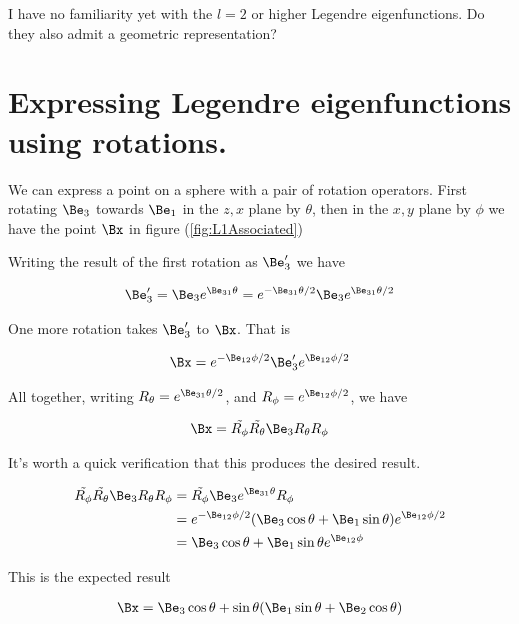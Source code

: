 I have no familiarity yet with the $l=2$ or higher Legendre eigenfunctions.  Do they also admit a geometric representation?

\section{Expressing Legendre eigenfunctions using rotations.}

We can express a point on a sphere with a pair of rotation operators.  First rotating $\Be_3$ towards $\Be_1$ in the $z,x$ plane by $\theta$, then in the $x,y$ plane by $\phi$ we have the point $\Bx$ in figure (\ref{fig:L1Associated})

Writing the result of the first rotation as $\Be_3'$ we have

\begin{align}\label{eqn:foob1}
\Be_3' = \Be_3 e^{\Be_{31}\theta} = e^{-\Be_{31}\theta/2} \Be_3 e^{\Be_{31}\theta/2} 
\end{align}

One more rotation takes $\Be_3'$ to $\Bx$.  That is

\begin{align}\label{eqn:foob2}
\Bx = e^{-\Be_{12}\phi/2} \Be_3' e^{\Be_{12}\phi/2} 
\end{align}

All together, writing $R_\theta = e^{\Be_{31}\theta/2}$, and $R_\phi = e^{\Be_{12}\phi/2}$, we have

\begin{align}\label{eqn:foob3}
\Bx = \tilde{R_\phi} \tilde{R_\theta} \Be_3 R_\theta R_\phi
\end{align}

It's worth a quick verification that this produces the desired result.

\begin{align*}
\tilde{R_\phi} \tilde{R_\theta} \Be_3 R_\theta R_\phi 
&= \tilde{R_\phi} \Be_3 e^{\Be_{31}\theta} R_\phi \\
&= e^{-\Be_{12}\phi/2} (\Be_3 \cos\theta + \Be_1 \sin\theta) e^{\Be_{12}\phi/2} \\
&= 
\Be_3 \cos\theta + \Be_1 \sin\theta e^{\Be_{12}\phi} \\
\end{align*}

This is the expected result

\begin{align}\label{eqn:foob4}
\Bx = \Be_3 \cos\theta + \sin\theta (\Be_1 \sin\theta + \Be_2 \cos\theta) 
\end{align}

